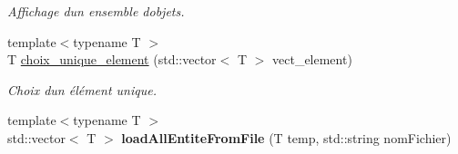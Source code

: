 \begin{DoxyCompactItemize}
\begin{DoxyCompactList}\small\item\em Affichage d\textquotesingle{}un ensemble d\textquotesingle{}objets. \end{DoxyCompactList}\item 
{\footnotesize template$<$typename T $>$ }\\T \hyperlink{namespaceio_a379c013a79ad2d343811725631472b20}{choix\+\_\+unique\+\_\+element} (std\+::vector$<$ T $>$ vect\+\_\+element)
\begin{DoxyCompactList}\small\item\em Choix d\textquotesingle{}un élément unique. \end{DoxyCompactList}\item 
\mbox{\label{namespaceio_a97ddce5128c7df7d67966208e2c37c4c}} 
{\footnotesize template$<$typename T $>$ }\\std\+::vector$<$ T $>$ {\bfseries load\+All\+Entite\+From\+File} (T temp, std\+::string nom\+Fichier)
\end{DoxyCompactItemize}
